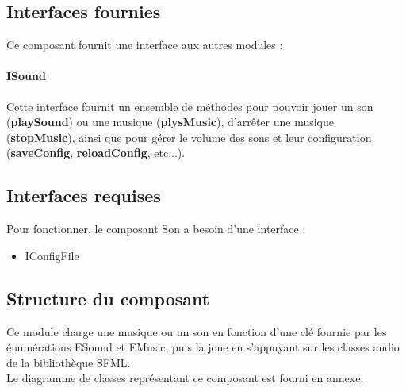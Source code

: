 \subsection{Interfaces fournies}

Ce composant fournit une interface aux autres modules :

\paragraph{ISound}

Cette interface fournit un ensemble de méthodes pour pouvoir jouer un son (\textbf{playSound}) ou une musique (\textbf{plysMusic}), d'arrêter une musique (\textbf{stopMusic}), ainsi que pour gérer le volume des sons et leur configuration (\textbf{saveConfig}, \textbf{reloadConfig}, etc...).

\subsection{Interfaces requises}

Pour fonctionner, le composant Son a besoin d'une interface :
\begin{itemize}
    \item IConfigFile
\end{itemize}

\subsection{Structure du composant}

Ce module charge une musique ou un son en fonction d'une clé fournie par les énumérations ESound et EMusic, puis la joue en s'appuyant sur les classes audio de la bibliothèque SFML.\\

Le diagramme de classes représentant ce composant est fourni en annexe.